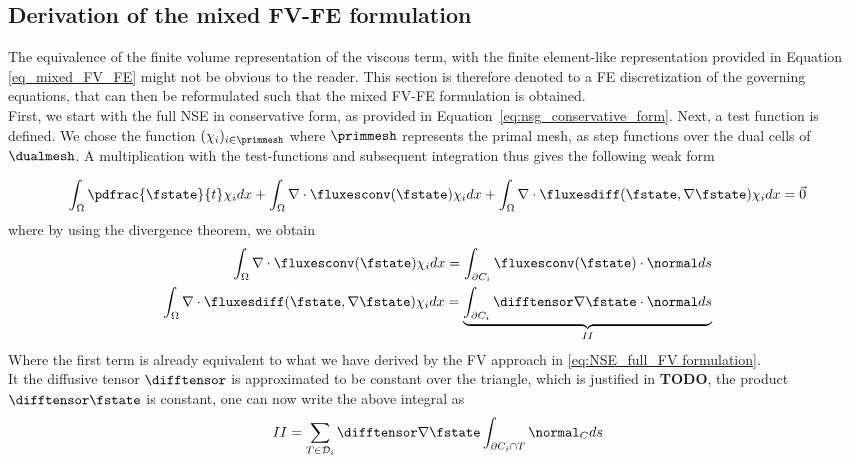 \documentclass[../main.tex]{subfiles}
\begin{document}
\cleardoublepage
\subsection{Derivation of the mixed \ac{FV}-\ac{FE} formulation}\label{sec:viscous_term_treatment}
The equivalence of the finite volume representation of the viscous term, with the finite element-like representation provided in Equation \eqref{eq_mixed_FV_FE} might not be obvious to the reader. This section is therefore denoted to a \ac{FE} discretization of the governing equations, that can then be reformulated such that the mixed \ac{FV}-\ac{FE} formulation is obtained.\\
First, we start with the full \ac{NSE} in conservative form, as provided in Equation~\eqref{eq:nsg_conservative_form}. Next, a test function is defined. We chose the function $({\chi_i})_{i\in \primmesh}$ where $\primmesh$ represents the primal mesh, as step functions over the dual cells of $\dualmesh$.
A multiplication with the test-functions and subsequent integration thus gives the following weak form

\begin{align}\label{fv_weak_form_felike}
  \int_\Omega \pdfrac{\fstate}{t}\chi_i dx + \int_\Omega \nabla \cdot \fluxesconv(\fstate)\chi_i dx + \int_\Omega \nabla \cdot \fluxesdiff(\fstate,\nabla  \fstate)\chi_i dx = \vec{0} \\
\end{align}
where by using the divergence theorem, we obtain
\begin{align}\label{eq:divtheorem_felike}
  \int_\Omega \nabla \cdot \fluxesconv(\fstate)\chi_i dx = \int_{\partial C_i} \fluxesconv(\fstate)\cdot \normal ds \\
  \int_\Omega \nabla \cdot \fluxesdiff(\fstate,\nabla \fstate)\chi_i dx = \underbrace{\int_{\partial C_i} \difftensor \nabla\fstate\cdot \normal ds}_{II}
\end{align}
Where the first term is already equivalent to what we have derived by the \ac{FV} approach in \eqref{eq:NSE_full_FV formulation}.\\



It the diffusive tensor $\difftensor$ is approximated to be constant over the triangle, which is justified in \textbf{TODO}, the product $\difftensor\fstate$ is constant, one can now write the above integral as
\begin{align}
II=\sum_{T \in \mathcal{D}_i} \difftensor \nabla\fstate\int_{\partial C_i \cap T} \normal_C ds
\end{align}
\end{document}
